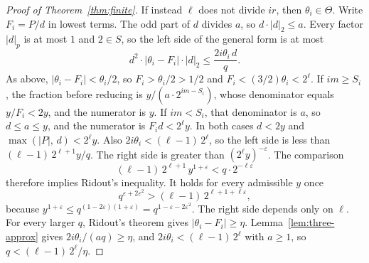 \documentclass[11pt]{article}
\begin{document}
\begin{proof}[Proof of Theorem~\ref{thm:finite}]
If instead $\ell$ does not divide $ir$, then $\theta_i \in \Theta$.
Write $F_i = P/d$ in lowest terms.
The odd part of $d$ divides $a$, so $d \cdot \lvert d \rvert_2 \le a$.
Every factor $\lvert d \rvert_p$ is at most $1$ and $2 \in S$, so the left side of the general form is at most
\[
d^2 \cdot \lvert \theta_i - F_i \rvert \cdot \lvert d \rvert_2 \le \frac{2i\theta_i\, d}{q}.
\]
As above, $\lvert \theta_i - F_i \rvert < \theta_i/2$, so $F_i > \theta_i/2 > 1/2$ and $F_i < (3/2)\theta_i < 2^\ell$.
If $im \ge S_i$, the fraction before reducing is $y/(a \cdot 2^{im-S_i})$, whose denominator equals $y/F_i < 2y$, and the numerator is $y$.
If $im < S_i$, that denominator is $a$, so $d \le a \le y$, and the numerator is $F_i d < 2^\ell y$.
In both cases $d < 2y$ and $\max(\lvert P \rvert,\, d) < 2^\ell y$.
Also $2i\theta_i < (\ell-1)\, 2^\ell$, so the left side is less than $(\ell-1)\, 2^{\ell+1} y/q$.
The right side is greater than $(2^\ell y)^{-\varepsilon}$.
The comparison
\[
(\ell-1)\, 2^{\ell+1}\, y^{1+\varepsilon} < q \cdot 2^{-\ell\varepsilon}
\]
therefore implies Ridout's inequality.
It holds for every admissible $y$ once
\[
q^{\varepsilon + 2\varepsilon^2} > (\ell-1)\, 2^{\ell + 1 + \ell\varepsilon},
\]
because $y^{1+\varepsilon} \le q^{(1-2\varepsilon)(1+\varepsilon)} = q^{1 - \varepsilon - 2\varepsilon^2}$.
The right side depends only on $\ell$.
For every larger $q$, Ridout's theorem gives $\lvert \theta_i - F_i \rvert \ge \eta$.
Lemma~\ref{lem:three-approx} gives $2i\theta_i/(aq) \ge \eta$, and $2i\theta_i < (\ell-1)\, 2^\ell$ with $a \ge 1$, so $q < (\ell-1)\, 2^\ell/\eta$.


\end{proof}
\end{document}
